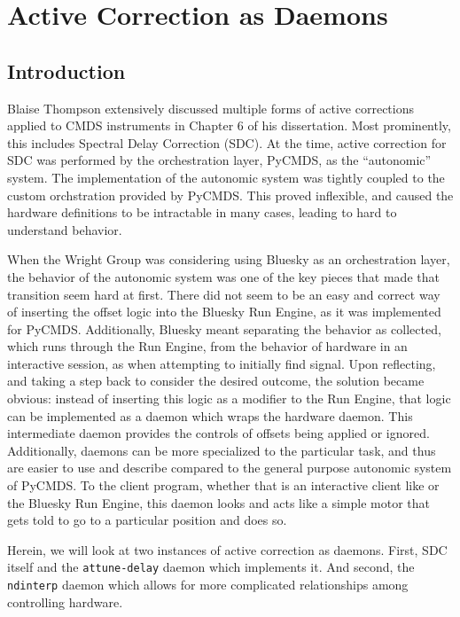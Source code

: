 \chapter{Active Correction as Daemons} \label{cha:opa400}

\clearpage

\section{Introduction}  %

Blaise Thompson extensively discussed multiple forms of active corrections applied to CMDS instruments in Chapter 6 of his dissertation\cite{ThompsonBlaiseJonathan2018a}.
Most prominently, this includes Spectral Delay Correction (SDC).
At the time, active correction for SDC was performed by the orchestration layer, PyCMDS, as the ``autonomic'' system.
The implementation of the autonomic system was tightly coupled to the custom orchstration provided by PyCMDS.
This proved inflexible, and caused the hardware definitions to be intractable in many cases, leading to hard to understand behavior.

When the Wright Group was considering using Bluesky as an orchestration layer, the behavior of the autonomic system was one of the key pieces that made that transition seem hard at first.
There did not seem to be an easy and correct way of inserting the offset logic into the Bluesky Run Engine, as it was implemented for PyCMDS.
Additionally, Bluesky meant separating the behavior as collected, which runs through the Run Engine, from the behavior of hardware in an interactive session, as when attempting to initially find signal.
Upon reflecting, and taking a step back to consider the desired outcome, the solution became obvious: instead of inserting this logic as a modifier to the Run Engine, that logic can be implemented as a daemon which wraps the hardware daemon.
This intermediate daemon provides the controls of offsets being applied or ignored.
Additionally, daemons can be more specialized to the particular task, and thus are easier to use and describe compared to the general purpose autonomic system of PyCMDS.
To the client program, whether that is an interactive client like \yaqcqtpy{} or the Bluesky Run Engine, this daemon looks and acts like a simple motor that gets told to go to a particular position and does so.

Herein, we will look at two instances of active correction as daemons.
First, SDC itself and the \texttt{attune-delay} daemon which implements it.
And second, the \texttt{ndinterp} daemon which allows for more complicated relationships among controlling hardware.

